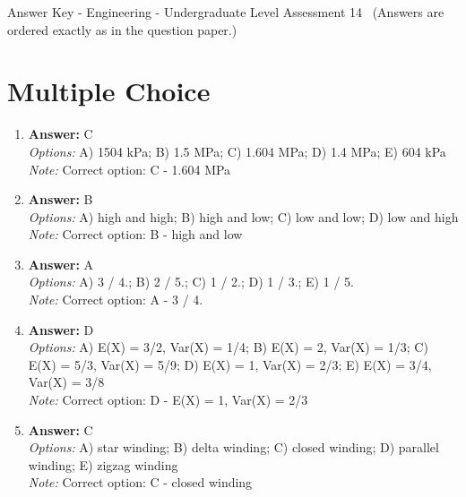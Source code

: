 \documentclass[12pt]{article}
\begin{document}
\begin{center}
Answer Key - Engineering - Undergraduate Level Assessment 14 \
\small (Answers are ordered exactly as in the question paper.)
\end{center}

\section*{Multiple Choice}
\begin{enumerate}[label=\arabic*.]
\item \textbf{Answer:} C
\\ \textit{Options:} A) 1504 kPa; B) 1.5 MPa; C) 1.604 MPa; D) 1.4 MPa; E) 604 kPa
\\ \textit{Note:} Correct option: C - 1.604 MPa
\item \textbf{Answer:} B
\\ \textit{Options:} A) high and high; B) high and low; C) low and low; D) low and high
\\ \textit{Note:} Correct option: B - high and low
\item \textbf{Answer:} A
\\ \textit{Options:} A) 3 / 4.; B) 2 / 5.; C) 1 / 2.; D) 1 / 3.; E) 1 / 5.
\\ \textit{Note:} Correct option: A - 3 / 4.
\item \textbf{Answer:} D
\\ \textit{Options:} A) E(X) = 3/2, Var(X) = 1/4; B) E(X) = 2, Var(X) = 1/3; C) E(X) = 5/3, Var(X) = 5/9; D) E(X) = 1, Var(X) = 2/3; E) E(X) = 3/4, Var(X) = 3/8
\\ \textit{Note:} Correct option: D - E(X) = 1, Var(X) = 2/3
\item \textbf{Answer:} C
\\ \textit{Options:} A) star winding; B) delta winding; C) closed winding; D) parallel winding; E) zigzag winding
\\ \textit{Note:} Correct option: C - closed winding
\end{enumerate}
\end{document}
